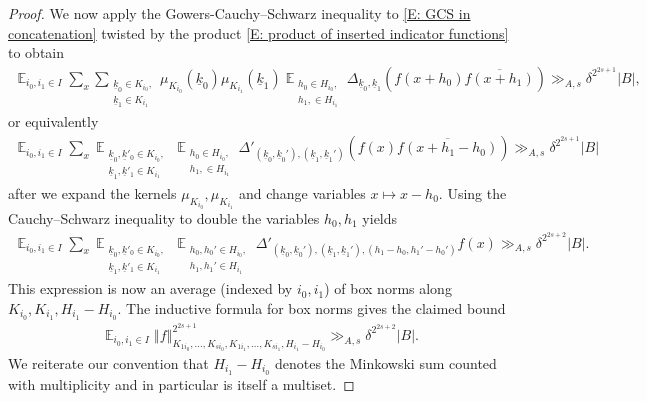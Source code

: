 \documentclass[11pt]{amsart}
\theoremstyle{definition}
\DeclareMathOperator*{\E}{\mathbb{E}}
\newcommand{\uk}{{\underline{k}}}
\newcommand{\norm}[1]{\left\Vert #1\right\Vert}
\begin{document}
\begin{proof}
    
    We now apply the Gowers-Cauchy--Schwarz inequality to \eqref{E: GCS in concatenation} twisted by the product \eqref{E: product of inserted indicator functions} to obtain
    \begin{align*}
        \E_{i_0, i_1\in I} \sum_x  \sum_{\substack{\uk_0\in K_{i_0},\\ \uk_1\in K_{i_1}}} \mu_{K_{i_0}}(\uk_0) \mu_{K_{i_1}}(\uk_1) \E_{\substack{h_0\in H_{i_0},\\ h_1, \in H_{i_1}}} \Delta_{\uk_0, \uk_1}(f(x+h_0)\overline{f(x+h_1)})\gg_{A, s} \delta^{2^{2s+1}}|B|,
    \end{align*}
    or equivalently
    \begin{align*}
        \E_{i_0, i_1\in I} \sum_x  \E_{\substack{\uk_0, \uk'_0 \in K_{i_0},\\ \uk_1, \uk'_1 \in K_{i_1}}} \E_{\substack{h_0\in H_{i_0},\\ h_1, \in H_{i_1}}} \Delta'_{(\uk_0,\uk_0'), (\uk_1, \uk_1')}(f(x)\overline{f(x+h_1-h_0)})\gg_{A, s} \delta^{2^{2s+1}}|B|
    \end{align*}
    after we expand the kernels $\mu_{K_{i_0}}, \mu_{K_{i_1}}$ and change variables $x\mapsto x - h_0$. Using the Cauchy--Schwarz inequality to double the variables $h_0, h_1$ yields
    \begin{align*}
        \E_{i_0, i_1\in I} \sum_x  \E_{\substack{\uk_0, \uk'_0 \in K_{i_0},\\ \uk_1, \uk'_1 \in K_{i_1}}} \E_{\substack{h_0, h_0'\in H_{i_0},\\ h_1, h_1' \in H_{i_1}}} \Delta'_{(\uk_0,\uk_0'), (\uk_1, \uk_1'), (h_1-h_0, h_1'-h_0')}f(x)\gg_{A, s} \delta^{2^{2s+2}}|B|.
    \end{align*}
    This expression is now an average (indexed by $i_0, i_1$) of box norms along $K_{i_0}, K_{i_1}, H_{i_1}-H_{i_0}$.  The inductive formula for box norms gives the claimed bound
    \begin{align*}
        \E_{i_0, i_1\in I}\norm{f}_{K_{1 i_0}, \ldots, K_{s i_0}, K_{1 i_1}, \ldots, K_{s i_1}, H_{i_1}-H_{i_0}}^{2^{2s+1}}\gg_{A, s}\delta^{2^{2s+2}} |B|.
    \end{align*}
    We reiterate our convention that $H_{i_1}-H_{i_0}$ denotes the Minkowski sum counted with multiplicity and in particular is itself a multiset.
\end{proof}
\end{document}
